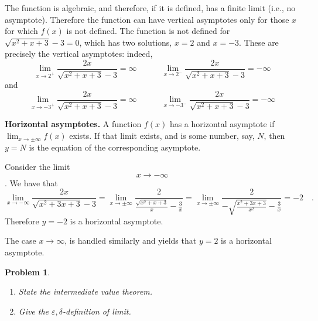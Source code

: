 \documentclass{article}
\newtheorem{problem}{Problem}
\begin{document}
The function is algebraic, and therefore, if it is defined, has a finite limit (i.e., no asymptote). Therefore the function can have vertical asymptotes only for those $x$ for which $f(x)$ is not defined. The function is not defined for $\sqrt{x^2+x+3}-3=0$, which has two solutions, $x=2$ and $x=-3$. These are precisely the vertical asymptotes: indeed, 
\[
\lim_{x\to 2^+} \frac{2x}{\sqrt{x^2+x+3}-3}=\infty \quad \quad \quad 
\lim_{x\to 2^-} \frac{2x}{\sqrt{x^2+x+3}-3}=-\infty 
\]
and
\[
\lim_{x\to -3^+} \frac{2x}{\sqrt{x^2+x+3}-3}=\infty \quad \quad \quad 
\lim_{x\to -3^-} \frac{2x}{\sqrt{x^2+x+3}-3}=-\infty 
\]

\textbf{Horizontal asymptotes.} A function $f(x)$ has a horizontal asymptote if $\lim_{x\to \pm\infty} f(x)$ exists. If that limit exists, and is some number, say, $N$, then $y=N$ is the equation of the corresponding asymptote.

Consider the limit $$x\to -\infty$$. We have that 
\[
\lim_{x\to -\infty} \frac{2x}{\sqrt{x^2+3x+3}-3}= \lim_{x\to \pm \infty} \frac{2}{\frac{\sqrt{x^2+x+3}}x-\frac3x}=\lim_{x\to \pm \infty} \frac{2}{-\sqrt{\frac{x^2+3x+3}{x^2}}-\frac3x} =-2\quad . 
\]
Therefore $y=-2$ is a horizontal asymptote. 

The case $x\to \infty$, is handled similarly and yields that $y=2$ is a horizontal asymptote.


\begin{problem}~
\begin{enumerate}
\item State the intermediate value theorem.
\item Give the $\varepsilon,\delta$-definition of limit.
\end{enumerate}
\end{problem}
\end{document}
